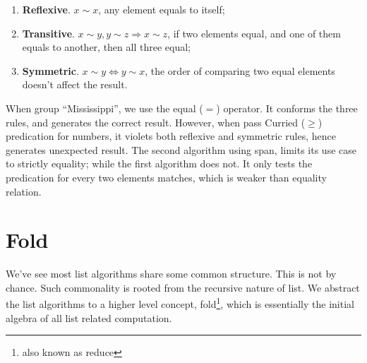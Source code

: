 \documentclass[b5paper]{article}
\begin{document}
\begin{enumerate}
\item \textbf{Reflexive}. $x \sim x$, any element equals to itself;
\item \textbf{Transitive}. $x \sim y, y \sim z \Rightarrow x \sim z$, if two elements equal, and one of them equals to another, then all three equal;
\item \textbf{Symmetric}. $x \sim y \Leftrightarrow y \sim x$, the order of comparing two equal elements doesn't affect the result.
\end{enumerate}

When group ``Mississippi'', we use the equal ($=$) operator. It conforms the three rules, and generates the correct result. However, when pass Curried ($\geq$) predication for numbers, it violets both reflexive and symmetric rules, hence generates unexpected result. The second algorithm using span, limits its use case to strictly equality; while the first algorithm does not. It only tests the predication for every two elements matches, which is weaker than equality relation.

\begin{Exercise}
\end{Exercise}

\section{Fold}
 \label{sec:fold}

We've see most list algorithms share some common structure. This is not by chance. Such commonality is rooted from the recursive nature of list. We abstract the list algorithms to a higher level concept, fold\footnote{also known as reduce}, which is essentially the initial algebra of all list related computation\cite{unplugged}.
\end{document}
